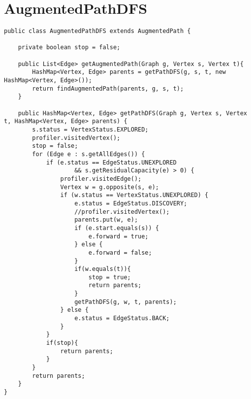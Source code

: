 \chapter{AugmentedPathDFS}
\lstset{language=Java}
\begin{lstlisting}[caption=AugmentedPathDFS Source Code]
public class AugmentedPathDFS extends AugmentedPath {

	private boolean stop = false;
	
	public List<Edge> getAugmentedPath(Graph g, Vertex s, Vertex t){
		HashMap<Vertex, Edge> parents = getPathDFS(g, s, t, new HashMap<Vertex, Edge>());
		return findAugmentedPath(parents, g, s, t);
	}
	
	public HashMap<Vertex, Edge> getPathDFS(Graph g, Vertex s, Vertex t, HashMap<Vertex, Edge> parents) {
		s.status = VertexStatus.EXPLORED;
		profiler.visitedVertex();
		stop = false;
		for (Edge e : s.getAllEdges()) {
			if (e.status == EdgeStatus.UNEXPLORED
					&& s.getResidualCapacity(e) > 0) {
				profiler.visitedEdge();
				Vertex w = g.opposite(s, e);
				if (w.status == VertexStatus.UNEXPLORED) {
					e.status = EdgeStatus.DISCOVERY;
					//profiler.visitedVertex();
					parents.put(w, e);
					if (e.start.equals(s)) {
						e.forward = true;
					} else {
						e.forward = false;
					}
					if(w.equals(t)){
						stop = true;
						return parents;
					}
					getPathDFS(g, w, t, parents);
				} else {
					e.status = EdgeStatus.BACK;
				}
			}
			if(stop){
				return parents;
			}
		}
		return parents;
	}
}
\end{lstlisting}